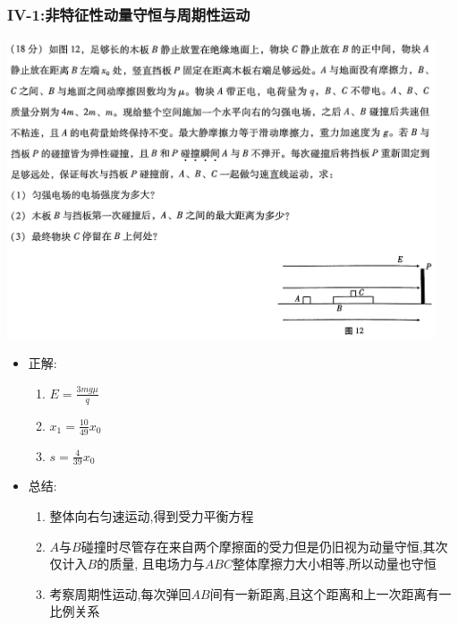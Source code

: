 \documentclass{article}
\begin{document}
\vspace{2em}

\subsubsection{IV-1:非特征性动量守恒与周期性运动}
\includegraphics[width=0.95\textwidth,keepaspectratio]{./pictures/3.4-3.png}

\begin{itemize}
    \item 正解: \hspace{3em}\begin{enumerate}[label = (\arabic*{})]
              \item $E = \frac{3mg\mu}{q}$
              \item $x_{1} = \frac{10}{49}x_{0}$
              \item $s = \frac{4}{39}x_{0}$
          \end{enumerate}
    \item 总结: \hspace{3em}\begin{enumerate}[label = (\arabic*{})]
              \item 整体向右匀速运动,得到受力平衡方程
              \item $A$与$B$碰撞时尽管存在来自两个摩擦面的受力但是仍旧视为动量守恒,其次仅计入$B$的质量,
                    且电场力与$ABC$整体摩擦力大小相等,所以动量也守恒
              \item 考察周期性运动,每次弹回$AB$间有一新距离,且这个距离和上一次距离有一比例关系
          \end{enumerate}
\end{itemize}
\end{document}
